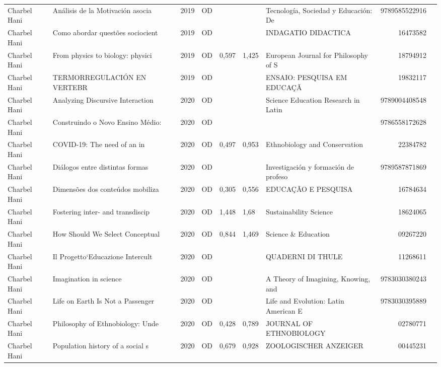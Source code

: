 \documentclass[12pt,brazil]{article}\usepackage[]{graphicx}\usepackage[]{xcolor}
\begin{document}
\begin{longtable}{lllrrllrr}
Charbel Hani & Análisis de la Motivación asocia & 2019 & OD &  &  & Tecnología, Sociedad y Educación: De & 9789585522916 \\
Charbel Hani & Como abordar questões sociocient & 2019 & OD &  &  & INDAGATIO DIDACTICA & 16473582 \\
Charbel Hani & From physics to biology: physici & 2019 & OD & 0,597 & 1,425 & European Journal for Philosophy of S & 18794912 \\
Charbel Hani & TERMORREGULACIÓN EN VERTEBR & 2019 & OD &  &  & ENSAIO: PESQUISA EM EDUCAÇÃ & 19832117 \\
Charbel Hani & Analyzing Discursive Interaction & 2020 & OD &  &  & Science Education Research in Latin  & 9789004408548 \\
Charbel Hani & Construindo o Novo Ensino Médio: & 2020 & OD &  &  &  & 9786558172628 \\
Charbel Hani & COVID-19: The need of an in & 2020 & OD & 0,497 & 0,953 & Ethnobiology and Conservation & 22384782 \\
Charbel Hani & Diálogos entre distintas formas  & 2020 & OD &  &  & Investigación y formación de profeso & 9789587871869 \\
Charbel Hani & Dimensões dos conteúdos mobiliza & 2020 & OD & 0,305 & 0,556 & EDUCAÇÃO E PESQUISA & 16784634 \\
\rowcolor{coautr}\rowcolor{coautr}\rowcolor{coautr}\rowcolor{coautr}\rowcolor{coautr}\rowcolor{coautr}\rowcolor{coautr}\rowcolor{coautr}\rowcolor{coautr}\rowcolor{coautr}\rowcolor{coautr}\rowcolor{coautr}\rowcolor{coautr}\rowcolor{coautr}\rowcolor{coautr}\rowcolor{coautr}Charbel Hani & Fostering inter- and transdiscip & 2020 & OD & 1,448 & 1,68 & Sustainability Science & 18624065 \\
Charbel Hani & How Should We Select Conceptual  & 2020 & OD & 0,844 & 1,469 & Science \& Education & 09267220 \\
Charbel Hani & Il Progetto‘Educazione Intercult & 2020 & OD &  &  & QUADERNI DI THULE & 11268611 \\
Charbel Hani & Imagination in science & 2020 & OD &  &  & A Theory of Imagining, Knowing, and  & 9783030380243 \\
Charbel Hani & Life on Earth Is Not a Passenger & 2020 & OD &  &  & Life and Evolution: Latin American E & 9783030395889 \\
Charbel Hani & Philosophy of Ethnobiology: Unde & 2020 & OD & 0,428 & 0,789 & JOURNAL OF ETHNOBIOLOGY & 02780771 \\
\rowcolor{coautr}\rowcolor{coautr}\rowcolor{coautr}\rowcolor{coautr}\rowcolor{coautr}\rowcolor{coautr}\rowcolor{coautr}\rowcolor{coautr}\rowcolor{coautr}\rowcolor{coautr}\rowcolor{coautr}\rowcolor{coautr}\rowcolor{coautr}\rowcolor{coautr}\rowcolor{coautr}\rowcolor{coautr}Charbel Hani & Population history of a social s & 2020 & OD & 0,679 & 0,928 & ZOOLOGISCHER ANZEIGER & 00445231 \\

\end{longtable}
\end{document}
